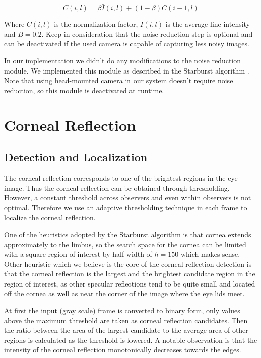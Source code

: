 \documentclass[12pt,fleqn]{book} %
\begin{document}
\begin{dBox}
\begin{equation}
	C(i,l) = \beta \bar I  (i,l) + (1 - \beta) C(i-1, l)
\end{equation}
\end{dBox}

Where $C(i,l)$ is the normalization factor, $I(i,l)$ is the average line intensity and $B = 0.2$. Keep in consideration that the noise reduction step is optional and can be deactivated if the used camera is capable of capturing less noisy images.

In our implementation we didn't do any modifications to the noise reduction module. We implemented this module as described in the Starburst algorithm \cite{starburst}. Note that using head-mounted camera in our system doesn't require noise reduction, so this module is deactivated at runtime.


\section{Corneal Reflection}
\subsection{Detection and Localization}

The corneal reflection corresponds to one of the brightest regions in the eye image. Thus the corneal reflection can be obtained through thresholding. However, a constant threshold across observers and even within observers is not optimal. Therefore we use an adaptive thresholding technique in each frame to localize the corneal reflection. \bigskip

One of the heuristics adopted by the Starburst algorithm is that cornea extends approximately to the limbus, so the search space for the cornea can be limited with a square region of interest by half width of $h = 150$ which makes sense. Other heuristic which we believe is the core of the corneal reflection detection is that the corneal reflection is the largest and the brightest candidate region in the region of interest, as other specular reflections tend to be quite small and located off the cornea as well as near the corner of the image where the eye lids meet. \bigskip

At first the input (gray scale) frame is converted to binary form, only values above the maximum threshold are taken as corneal reflection candidates. Then the ratio between the area of the largest candidate to the average area of other regions is calculated as the threshold is lowered. A notable observation is that the intensity of the corneal reflection monotonically decreases towards the edges.\bigskip
\end{document}
